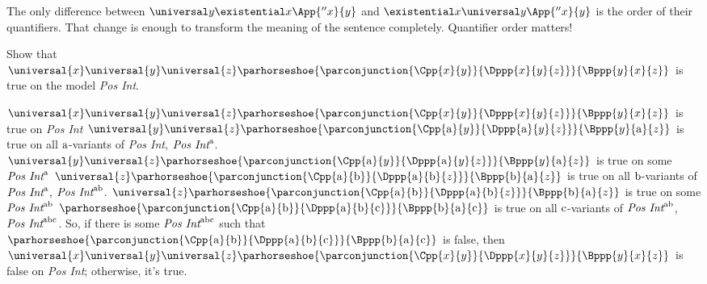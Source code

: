 \noindent{}The only difference between $\universal\variable{y}\existential\variable{x}\App{''\variable{x}}{\variable{y}}$ and $\existential\variable{x}\universal\variable{y}\App{''\variable{x}}{\variable{y}}$ is the order of their quantifiers. 
That change is enough to transform the meaning of the sentence completely. 
Quantifier order matters!

\begin{majorILnc}{}
Show that $\universal{\variable{x}}\universal{\variable{y}}\universal{\variable{z}}\parhorseshoe{\parconjunction{\Cpp{\variable{x}}{\variable{y}}}{\Dppp{\variable{x}}{\variable{y}}{\variable{z}}}}{\Bppp{\variable{y}}{\variable{x}}{\variable{z}}}$ is true on the model \emph{Pos Int}. 
\end{majorILnc}
\begin{PROOF}
\raggedright$\universal{\variable{x}}\universal{\variable{y}}\universal{\variable{z}}\parhorseshoe{\parconjunction{\Cpp{\variable{x}}{\variable{y}}}{\Dppp{\variable{x}}{\variable{y}}{\variable{z}}}}{\Bppp{\variable{y}}{\variable{x}}{\variable{z}}}$ is true on \emph{Pos Int} \Iff $\universal{\variable{y}}\universal{\variable{z}}\parhorseshoe{\parconjunction{\Cpp{\constant{a}}{\variable{y}}}{\Dppp{\constant{a}}{\variable{y}}{\variable{z}}}}{\Bppp{\variable{y}}{\constant{a}}{\variable{z}}}$ is true on all $\mathrm{a}$-variants of \emph{Pos Int}, $\emph{Pos Int}^{\mathrm{a}}$.
$\universal{\variable{y}}\universal{\variable{z}}\parhorseshoe{\parconjunction{\Cpp{\constant{a}}{\variable{y}}}{\Dppp{\constant{a}}{\variable{y}}{\variable{z}}}}{\Bppp{\variable{y}}{\constant{a}}{\variable{z}}}$ is true on some $\emph{Pos Int}^{\mathrm{a}}$ \Iff $\universal{\variable{z}}\parhorseshoe{\parconjunction{\Cpp{\constant{a}}{\constant{b}}}{\Dppp{\constant{a}}{\constant{b}}{\variable{z}}}}{\Bppp{\constant{b}}{\constant{a}}{\variable{z}}}$ is true on all $\mathrm{b}$-variants of $\emph{Pos Int}^{\mathrm{a}}$, $\emph{Pos Int}^{\mathrm{a}\mathrm{b}}$.
$\universal{\variable{z}}\parhorseshoe{\parconjunction{\Cpp{\constant{a}}{\constant{b}}}{\Dppp{\constant{a}}{\constant{b}}{\variable{z}}}}{\Bppp{\constant{b}}{\constant{a}}{\variable{z}}}$ is true on some $\emph{Pos Int}^{\mathrm{a}\mathrm{b}}$ \Iff $\parhorseshoe{\parconjunction{\Cpp{\constant{a}}{\constant{b}}}{\Dppp{\constant{a}}{\constant{b}}{\constant{c}}}}{\Bppp{\constant{b}}{\constant{a}}{\constant{c}}}$ is true on all $\mathrm{c}$-variants of $\emph{Pos Int}^{\mathrm{a}\mathrm{b}}$, $\emph{Pos Int}^{\mathrm{a}\mathrm{b}\mathrm{c}}$.
So, if there is some $\emph{Pos Int}^{\mathrm{a}\mathrm{b}\mathrm{c}}$ such that $\parhorseshoe{\parconjunction{\Cpp{\constant{a}}{\constant{b}}}{\Dppp{\constant{a}}{\constant{b}}{\constant{c}}}}{\Bppp{\constant{b}}{\constant{a}}{\constant{c}}}$ is false, then $\universal{\variable{x}}\universal{\variable{y}}\universal{\variable{z}}\parhorseshoe{\parconjunction{\Cpp{\variable{x}}{\variable{y}}}{\Dppp{\variable{x}}{\variable{y}}{\variable{z}}}}{\Bppp{\variable{y}}{\variable{x}}{\variable{z}}}$ is false on \emph{Pos Int}; otherwise, it's true.

\end{PROOF}
